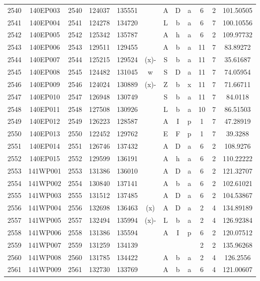 \begin{tabular}{|*{12}{c|}}
2540 & 140EP003 & 2540 & 124037 & 135551 &  & A & D & a & 6 & 2 & 101.50505 \\ 
2541 & 140EP004 & 2541 & 124278 & 134720 &  & L & b & a & 6 & 7 & 100.10556 \\ 
2542 & 140EP005 & 2542 & 125342 & 135787 &  & A & h & a & 6 & 2 & 109.97732 \\ 
2543 & 140EP006 & 2543 & 129511 & 129455 &  & A & b & a & 11 & 7 & 83.89272 \\ 
2544 & 140EP007 & 2544 & 125215 & 129524 & (x)- & S & b & a & 11 & 7 & 35.61687 \\ 
2545 & 140EP008 & 2545 & 124482 & 131045 & w & S & D & a & 11 & 7 & 74.05954 \\ 
2546 & 140EP009 & 2546 & 124024 & 130889 & (x)- & Z & b & x & 11 & 7 & 71.66711 \\ 
2547 & 140EP010 & 2547 & 126948 & 130749 &  & S & b & a & 11 & 7 & 84.0118 \\ 
2548 & 140EP011 & 2548 & 127508 & 130926 &  & L & b & a & 10 & 7 & 86.51503 \\ 
2549 & 140EP012 & 2549 & 126223 & 128587 &  & A & I & p & 1 & 7 & 47.28919 \\ 
2550 & 140EP013 & 2550 & 122452 & 129762 &  & E & F & p & 1 & 7 & 39.3288 \\ 
2551 & 140EP014 & 2551 & 126746 & 137432 &  & A & D & a & 6 & 2 & 108.9276 \\ 
2552 & 140EP015 & 2552 & 129599 & 136191 &  & A & h & a & 6 & 2 & 110.22222 \\ 
2553 & 141WP001 & 2553 & 131386 & 136010 &  & A & D & a & 6 & 2 & 121.32707 \\ 
2554 & 141WP002 & 2554 & 130840 & 137141 &  & A & b & a & 6 & 2 & 102.61021 \\ 
2555 & 141WP003 & 2555 & 131512 & 137485 &  & A & D & a & 6 & 2 & 104.53867 \\ 
2556 & 141WP004 & 2556 & 132698 & 136463 & (x) & A & D & a & 2 & 4 & 134.89189 \\ 
2557 & 141WP005 & 2557 & 132494 & 135994 & (x)- & L & b & a & 2 & 4 & 126.92384 \\ 
2558 & 141WP006 & 2558 & 131386 & 135594 &  & A & I & p & 6 & 2 & 120.07512 \\ 
2559 & 141WP007 & 2559 & 131259 & 134139 &  &  &  &  & 2 & 2 & 135.96268 \\ 
2560 & 141WP008 & 2560 & 131785 & 134422 &  & A & b & a & 2 & 4 & 126.2556 \\ 
2561 & 141WP009 & 2561 & 132730 & 133769 &  & A & b & a & 6 & 4 & 121.00607 \\ 

\end{tabular}
